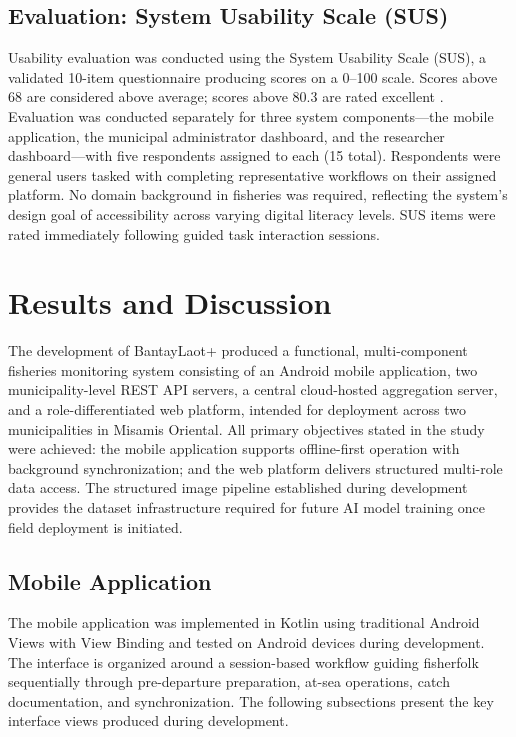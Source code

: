 \documentclass[journal]{IEEEtran}
\begin{document}
\subsection{Evaluation: System Usability Scale (SUS)}

Usability evaluation was conducted using the System Usability Scale (SUS), a validated
10-item questionnaire producing scores on a 0--100 scale. Scores above 68 are considered
above average; scores above 80.3 are rated excellent \cite{Bangor2008}. Evaluation was
conducted separately for three system components---the mobile application, the municipal
administrator dashboard, and the researcher dashboard---with five respondents assigned to
each (15 total). Respondents were general users tasked with completing representative
workflows on their assigned platform. No domain background in fisheries was required,
reflecting the system's design goal of accessibility across varying digital literacy
levels. SUS items were rated immediately following guided task interaction sessions.


\section{Results and Discussion}

The development of BantayLaot+ produced a functional,
multi-component fisheries monitoring system consisting of an Android mobile application,
two municipality-level REST API servers, a central cloud-hosted aggregation server, and a
role-differentiated web platform, intended for deployment across two municipalities in
Misamis Oriental. All primary objectives stated in the study were achieved: the mobile
application supports offline-first operation with background synchronization; and the web
platform delivers structured multi-role data access. The structured image pipeline
established during development provides the dataset infrastructure required for future
AI model training once field deployment is initiated.

\subsection{Mobile Application}

The mobile application was implemented in Kotlin using traditional Android Views with
View Binding and tested on Android devices during development. The interface is organized around a
session-based workflow guiding fisherfolk sequentially through pre-departure preparation,
at-sea operations, catch documentation, and synchronization. The following subsections
present the key interface views produced during development.
\end{document}
